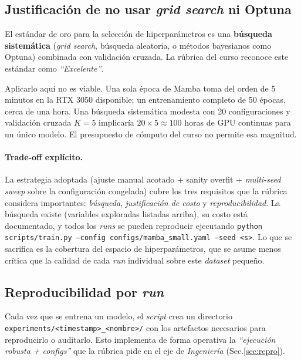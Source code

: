 \documentclass[11pt,a4paper]{article}
\begin{document}
\subsection{Justificación de no usar \textit{grid search} ni Optuna}
\label{subsec:why-no-grid}

El estándar de oro para la selección de hiperparámetros es una
\textbf{búsqueda sistemática} (\textit{grid search}, búsqueda
aleatoria, o métodos bayesianos como Optuna) combinada con validación
cruzada. La rúbrica del curso reconoce este estándar como
\textit{``Excelente''}.

Aplicarlo aquí no es viable. Una sola época de Mamba toma del orden de
5 minutos en la RTX 3050 disponible; un entrenamiento completo de 50
épocas, cerca de una hora. Una búsqueda sistemática modesta con 20
configuraciones y validación cruzada $K=5$ implicaría
$20 \times 5 \approx 100$ horas de GPU continuas para un único modelo.
El presupuesto de cómputo del curso no permite esa magnitud.

\paragraph{Trade-off explícito.}
La estrategia adoptada (ajuste manual acotado + sanity overfit +
\textit{multi-seed sweep} sobre la configuración congelada) cubre
los tres requisitos que la rúbrica considera importantes:
\textit{búsqueda},
\textit{justificación de costo} y
\textit{reproducibilidad}.
La búsqueda existe (variables exploradas listadas arriba), su costo
está documentado, y todos los \textit{runs} se pueden reproducir
ejecutando \texttt{python scripts/train.py --config configs/mamba\_small.yaml
--seed <s>}. Lo que se sacrifica es la cobertura del espacio de
hiperparámetros, que se asume menos crítica que la calidad de cada
\textit{run} individual sobre este \textit{dataset} pequeño.

\subsection{Reproducibilidad por \textit{run}}
\label{subsec:run-repro}

Cada vez que se entrena un modelo, el \textit{script} crea un
directorio \texttt{experiments/<timestamp>\_<nombre>/} con los
artefactos necesarios para reproducirlo o auditarlo. Esto implementa
de forma operativa la \textit{``ejecución robusta + configs''} que la
rúbrica pide en el eje de \textit{Ingeniería} (Sec.\ref{sec:repro}).
\end{document}

